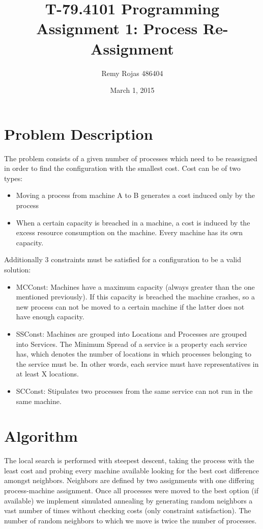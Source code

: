 \documentclass[11pt]{article}   %
\begin{document}
\title{T-79.4101 Programming Assignment 1: Process Re-Assignment}   
\author{Remy Rojas 486404}  %
\date{March 1, 2015}            %
\maketitle

\section{Problem Description}    

The problem consists of a given number of processes which need to be reassigned in order to find the configuration with the smallest cost. Cost can be of two types: 
\begin{itemize}
    \item Moving a process from machine A to B generates a cost induced only by the process
    \item When a certain capacity is breached in a machine, a cost is induced by the excess resource consumption on the machine. Every machine has its own capacity.
\end{itemize}
Additionally 3 constraints must be satisfied for a configuration to be a valid solution:
\begin{itemize}
    \item MCConst: Machines have a maximum capacity (always greater than the one mentioned previously). 
    If this capacity is breached the machine crashes, so a new process can not be moved to a certain machine if the latter does not have enough capacity.
    \item SSConst: Machines are grouped into Locations and Processes are grouped into Services. The Minimum Spread of a service is a property each service has, which denotes the number of locations in which processes belonging to the service must be. In other words, each service must have representatives in at least X locations.
    \item SCConst: Stipulates two processes from the same service can not run in the same machine.
\end{itemize} 
 
 

\section{Algorithm}       

The local search is performed with steepest descent, taking the process with the least cost
and probing every machine available looking for the best cost difference amongst neighbors.
Neighbors are defined by two assignments with one differing process-machine assignment.
Once all processes were moved to the best option (if available) we implement simulated annealing
by generating random neighbors a vast number of times without checking costs (only constraint satisfaction).
The number of random neighbors to which we move is twice the number of processes.
\end{document}

